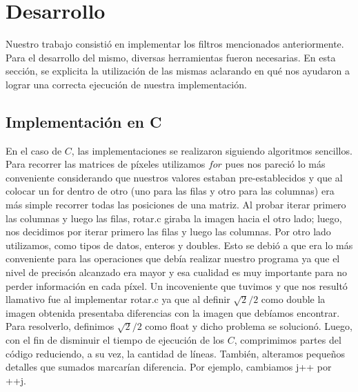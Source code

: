 \documentclass[10pt, a4paper]{article}
\begin{document}
\section{Desarrollo}
Nuestro trabajo consistió en implementar los filtros mencionados anteriormente. Para el desarrollo del mismo, diversas herramientas fueron necesarias. En esta sección, se explicita la utilización de las mismas aclarando en qué nos ayudaron a lograr una correcta ejecución de nuestra implementación.  
\subsection{Implementación en C}
En el caso de $C$, las implementaciones se realizaron siguiendo algoritmos sencillos. Para recorrer las matrices de píxeles utilizamos $for$ pues nos pareció lo más conveniente considerando que nuestros valores estaban pre-establecidos y que al colocar un for dentro de otro (uno para las filas y otro para las columnas) era más simple recorrer todas las posiciones de una matriz.\newline
Al probar iterar primero las columnas y luego las filas, rotar.c giraba la imagen hacia el otro lado; luego, nos decidimos por iterar primero las filas y luego las columnas.
\newline
Por otro lado utilizamos, como tipos de datos, enteros y doubles. Esto se debió a que era lo más conveniente para las operaciones que debía realizar nuestro programa ya que el nivel de precisón alcanzado era mayor y esa cualidad es muy importante para no perder información en cada píxel. Un incoveniente que tuvimos y que nos resultó llamativo fue al implementar rotar.c ya que al definir $\sqrt{2}/2$ como double la imagen obtenida presentaba diferencias con la imagen que debíamos encontrar. Para resolverlo, definimos $\sqrt{2}/2$ como float y dicho problema se solucionó.\newline
\newline
Luego, con el fin de disminuir el tiempo de ejecución de los $C$, comprimimos partes del código reduciendo, a su vez, la cantidad de líneas. También, alteramos pequeños detalles que sumados marcarían diferencia. Por ejemplo, cambiamos j++ por ++j.
\end{document}
